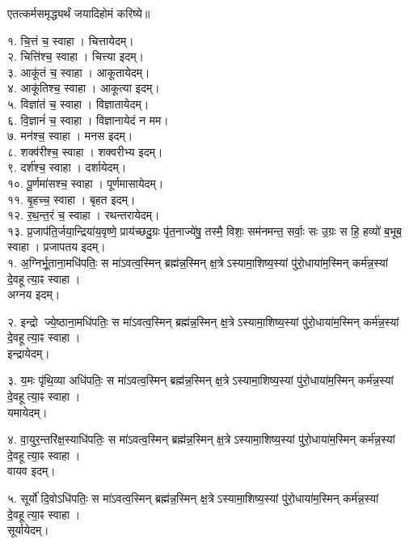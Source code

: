 
एतत्कर्मसमृद्ध्यर्थं जयादिहोमं करिष्ये॥

१. चि॒त्तं च॒ स्वाहा। चित्तायेदम्।\\
२. चित्ति॑श्च॒ स्वाहा। चित्त्या इदम्।\\
३. आकू॑तं च॒ स्वाहा। आकूतायेदम्।\\
४. आकू॑तिश्च॒ स्वाहा। आकूत्या इदम्।\\
५. विज्ञा॑तं च॒ स्वाहा। विज्ञातायेदम्।\\
६. वि॒ज्ञानं॑ च॒ स्वाहा। विज्ञानायेदं न मम।\\
७. मन॑श्च॒ स्वाहा। मनस इदम्।\\
८. शक्व॑रीश्च॒ स्वाहा। शक्वरीभ्य इदम्।\\
९. दर्श॑श्च॒ स्वाहा। दर्शायेदम्।\\
१०. पू॒र्णमा॑सश्च॒ स्वाहा। पूर्णमासायेदम्।\\
११. बृ॒हच्च॒ स्वाहा। बृहत इदम्।\\
१२. र॒थ॒न्त॒रं च॒ स्वाहा। रथन्तरायेदम्।\\
१३. प्र॒जाप॑ति॒र्जया॒न्द्रिया॑य॒वृष्णे॒ प्राय॑च्छदु॒ग्रः पृ॑त॒नाज्ये॑षु॒ तस्मै॒ विशः॒ सम॑नमन्त॒ सर्वाः॒ सः उ॒ग्रः स हि॒ हव्यो॑ ब॒भूब॒ स्वाहा। प्रजापतय इदम्।\\

१. अ॒ग्निर्भू॒ताना॒मधि॑पतिः॒ स मा॑ऽवत्व॒स्मिन् ब्रह्म॑न्न॒स्मिन् क्ष॒त्रेऽस्यामा॒शिष्य॒स्यां पु॑रो॒धाया॑म॒स्मिन् कर्म॑न्न॒स्यां दे॒वहूत्या॒ꣴ स्वाहा।\\
अग्नय इदम्।

२. इन्द्रो ज्ये॒ष्ठाना॒मधि॑पतिः॒ स मा॑ऽवत्व॒स्मिन् ब्रह्म॑न्न॒स्मिन् क्ष॒त्रेऽस्यामा॒शिष्य॒स्यां पु॑रो॒धाया॑म॒स्मिन् कर्म॑न्न॒स्यां दे॒वहूत्या॒ꣴ स्वाहा।\\
इन्द्रायेदम्।

३. य॒मः पृ॑थि॒व्या अधि॑पतिः॒ स मा॑ऽवत्व॒स्मिन् ब्रह्म॑न्न॒स्मिन् क्ष॒त्रेऽस्यामा॒शिष्य॒स्यां पु॑रो॒धाया॑म॒स्मिन् कर्म॑न्न॒स्यां दे॒वहूत्या॒ꣴ स्वाहा।\\
यमायेदम्।

४. वा॒युर॒न्तरि॑क्ष॒स्याधि॑पतिः॒ स मा॑ऽवत्व॒स्मिन् ब्रह्म॑न्न॒स्मिन् क्ष॒त्रेऽस्यामा॒शिष्य॒स्यां पु॑रो॒धाया॑म॒स्मिन् कर्म॑न्न॒स्यां दे॒वहूत्या॒ꣴ स्वाहा।\\
वायव इदम्।

५. सूर्यो॑ दि॒वोऽधि॑पतिः॒ स मा॑ऽवत्व॒स्मिन् ब्रह्म॑न्न॒स्मिन् क्ष॒त्रेऽस्यामा॒शिष्य॒स्यां पु॑रो॒धाया॑म॒स्मिन् कर्म॑न्न॒स्यां दे॒वहूत्या॒ꣴ स्वाहा।\\
सूर्यायेदम्।

